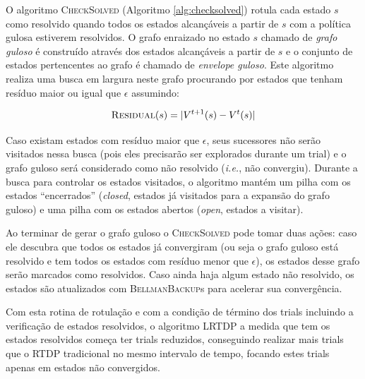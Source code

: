 \documentclass[letterpaper]{article}
\begin{document}

O algoritmo \textsc{CheckSolved} (Algoritmo \ref{alg:checksolved}) rotula cada estado $s$ como resolvido quando todos os estados alcançáveis a partir de $s$ com a política gulosa estiverem resolvidos. O grafo enraizado no estado $s$ chamado de \emph{grafo guloso} é construído através dos estados alcançáveis a partir de $s$ e o conjunto de estados pertencentes ao grafo é chamado de {\em envelope guloso}.
Este algoritmo realiza uma busca em largura neste grafo procurando por estados que tenham resíduo maior ou igual que $\epsilon$ assumindo:

\begin{equation} \label{eq:state_residual}
     \textsc{Residual}(s) = | V^{t+1}(s) - V^t(s)|
\end{equation}

Caso existam estados com resíduo maior que $\epsilon$, seus sucessores não serão visitados nessa busca (pois eles precisarão ser explorados durante um trial) e o grafo guloso será considerado como não resolvido (\textit{i.e.}, não convergiu).
Durante a busca para controlar os estados visitados, o algoritmo mantém um pilha com os estados ``encerrados'' (\textit{closed}, estados já visitados para a expansão do grafo guloso)  e uma pilha com os estados abertos (\textit{open}, estados a visitar).

Ao terminar de gerar o grafo guloso o \textsc{CheckSolved} pode tomar duas ações: caso ele descubra que todos os estados já convergiram (ou seja o grafo guloso está resolvido e tem todos os estados com resíduo menor que $\epsilon$), os estados desse grafo serão marcados como resolvidos. Caso ainda haja algum estado não resolvido, os estados são atualizados com \textsc{BellmanBackup}s para acelerar sua convergência.

Com esta rotina de rotulação e com a condição de término dos trials incluindo a verificação de estados resolvidos, o algoritmo LRTDP a medida que tem os estados resolvidos começa ter trials reduzidos, conseguindo realizar mais trials que o RTDP tradicional no mesmo intervalo de tempo, focando estes trials apenas em estados não  convergidos.
\end{document}
